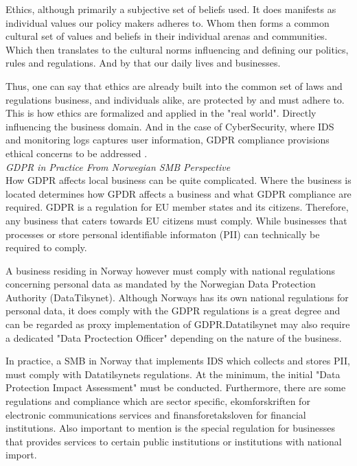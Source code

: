 Ethics, although primarily a subjective set of beliefs used. It does manifests as individual values our policy makers adheres to. Whom then forms a common cultural set of values and beliefs in their individual arenas and communities. Which then translates to the cultural norms influencing and defining our politics, rules and regulations. And by that our daily lives and businesses. 

Thus, one can say that ethics are already built into the common set of laws and regulations business, and individuals alike, are protected by and must adhere to. This is how ethics are formalized and applied in the "real world". Directly influencing the business domain. And in the case of CyberSecurity, where IDS and monitoring logs captures user information, GDPR compliance provisions ethical concerns to be addressed \cite{Haberkorn2019}.
\\
\textit{GDPR in Practice From Norwegian SMB Perspective }\\

How GDPR affects local business can be quite complicated. Where the business is located determines how GPDR affects a business and what GDPR compliance are required. GDPR is a regulation for EU member states and its citizens. Therefore, any business that caters towards EU citizens must comply. While businesses that processes or store personal identifiable informaton\cite{EuropeanCommission-PII} (PII) can technically be required to comply\cite{Wolford-GDPR_outside_EU}.

A business residing in Norway however must comply with national regulations concerning personal data as mandated by the Norwegian Data Protection Authority (DataTilsynet). Although Norways has its own national regulations for personal data, it does comply with the GDPR regulations is a great degree and can be regarded as proxy implementation of GDPR.Datatilsynet may also require a dedicated "Data Proctection Officer" depending on the nature of the business\cite{Datatilsynet2019_personvernombud}.

In practice, a SMB in Norway that implements IDS which collects and stores PII, must comply with Datatilsynets regulations. At the minimum, the initial "Data Protection Impact Assessment" must be conducted. Furthermore, there are some regulations and compliance which are sector specific, ekomforskriften for electronic communications services \cite{Lovdata2021_ekomforskriften} and finansforetaksloven \cite{Lovdata2016_finansforetaksloven} for financial institutions. Also important to mention is the special
regulation \cite{Lovdata2018_Sikkerhetsloven} for businesses that provides services to certain public institutions or institutions with national import.